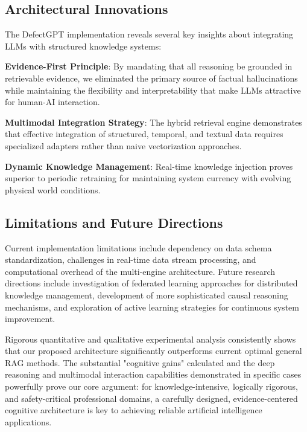 \subsection{Architectural Innovations}

The DefectGPT implementation reveals several key insights about integrating LLMs with structured knowledge systems:

\textbf{Evidence-First Principle}: By mandating that all reasoning be grounded in retrievable evidence, we eliminated the primary source of factual hallucinations while maintaining the flexibility and interpretability that make LLMs attractive for human-AI interaction.

\textbf{Multimodal Integration Strategy}: The hybrid retrieval engine demonstrates that effective integration of structured, temporal, and textual data requires specialized adapters rather than naive vectorization approaches.

\textbf{Dynamic Knowledge Management}: Real-time knowledge injection proves superior to periodic retraining for maintaining system currency with evolving physical world conditions.

\subsection{Limitations and Future Directions}

Current implementation limitations include dependency on data schema standardization, challenges in real-time data stream processing, and computational overhead of the multi-engine architecture. Future research directions include investigation of federated learning approaches for distributed knowledge management, development of more sophisticated causal reasoning mechanisms, and exploration of active learning strategies for continuous system improvement.

Rigorous quantitative and qualitative experimental analysis consistently shows that our proposed architecture significantly outperforms current optimal general RAG methods. The substantial "cognitive gains" calculated and the deep reasoning and multimodal interaction capabilities demonstrated in specific cases powerfully prove our core argument: for knowledge-intensive, logically rigorous, and safety-critical professional domains, a carefully designed, evidence-centered cognitive architecture is key to achieving reliable artificial intelligence applications.
